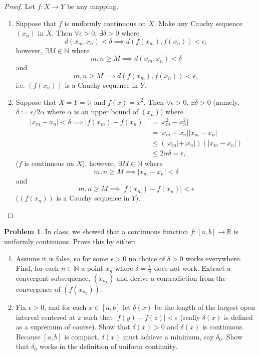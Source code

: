 \documentclass{amsart}
\theoremstyle{definition}
\newtheorem{problem}{Problem}
\begin{document}
\begin{proof}
    Let $f: X \to Y$ be any mapping.
    \begin{enumerate}[label = (\alph*)]
        \item Suppose that $f$ is uniformly continuous on $X$. Make any Cauchy sequence $(x_n)$ in $X$. Then $\forall \epsilon > 0$, $\exists \delta > 0$ where 
        \[
        d(x_m,x_n) < \delta \implies d(f(x_m),f(x_n)) < \epsilon;
        \]
        however, $\exists M \in \mathbb{N}$ where 
        \[
        m,n \geq M \implies d(x_m,x_n) < \delta
        \]
        and 
        \[
        m,n \geq M \implies d(f(x_m),f(x_n)) < \epsilon,
        \]
        i.e. $(f(x_n))$ is a Cauchy sequence in $Y$. 
        \item Suppose that $X = Y = \mathbb{R}$ and $f(x) = x^2$. Then $\forall \epsilon > 0$, $\exists \delta > 0$ (namely, $\delta := \epsilon / 2\alpha$ where $\alpha$ is an upper bound of $(x_n)$) where 
        \begin{align*}
            \vert x_m - x_n \vert < \delta \implies \vert f(x_m) - f(x_n) \vert &= \vert x_m^2 - x_n^2 \vert \\
            &= \vert x_m + x_n \vert \vert x_m - x_n \vert \\
            &\leq (\vert x_m \vert + \vert x_n \vert)(\vert x_m - x_n \vert) \\
            &\leq 2\alpha\delta = \epsilon,
        \end{align*}
        ($f$ is continuous on $X$); however, $\exists M \in \mathbb{N}$ where 
        \[
        m,n \geq M \implies \vert x_m - x_n \vert < \delta
        \]
        and 
        \[
        m,n \geq M \implies \vert f(x_m) - f(x_n) \vert < \epsilon
        \]
        ($(f(x_n))$ is a Cauchy sequence in $Y$).
    \end{enumerate}
\end{proof}

\begin{problem}
    In class, we showed that a continuous function $f: [a,b] \to \mathbb{R}$ is uniformly continuous. Prove this by either:
    \begin{enumerate}[label = (\alph*)]
        \item Assume it is false, so for some $\epsilon > 0$ no choice of $\delta > 0$ works everywhere. Find, for each $n \in \mathbb{N}$ a point $x_n$ where $\delta = \frac{1}{n}$ does not work. Extract a convergent subsequence, $(x_{n_k})$ and derive a contradiction from the convergence of $(f(x_{n_k}))$.   
        \item Fix $\epsilon > 0$, and for each $x \in [a, b]$ let $\delta(x)$ be the length of the largest open interval centered at $x$ such that $\vert f(y) - f(z) \vert < \epsilon$ (really $\delta(x)$ is defined as a supremum of course). Show that $\delta(x) > 0$ and $\delta(x)$ is continuous. Because $[a,b]$ is compact, $\delta(x)$ must achieve a minimum, say $\delta_0$. Show that $\delta_0$ works in the definition of uniform continuity.    
    \end{enumerate}
\end{problem}
\end{document}
